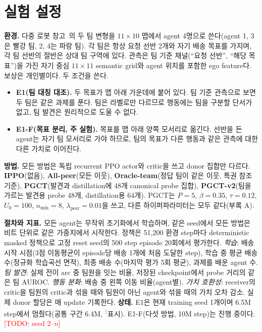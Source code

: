 \documentclass[twocolumn,10pt]{article}
\newcommand{\todo}[1]{\textcolor{red}{[TODO: #1]}}
\newcommand{\pilot}{\textsuperscript{\textcolor{gray}{$\dagger$}}}
\newcommand{\ours}{PGCT}
\begin{document}
\section{실험 설정}
\label{sec:setup}
\textbf{환경.} 다중 로봇 창고~\cite{papoudakis2021benchmarking}의 두 팀 변형을 $11\times10$ 맵에서 agent 4명으로 쓴다(agent 1, 3은 빨강 팀, 2, 4는 파랑 팀). 각 팀은
항상 요청 선반 2개와 자기 배송 목표를 가지며, 각 팀 선반의 절반은 상대 팀 구역에 있다. 관측은 팀 기준 채널(``요청 선반'', ``해당 목표'')을 가진 자기 중심
$11\times11$ semantic grid와 agent 위치를 포함한 ego feature다. 보상은 개인별이다. 두 조건을 쓴다.
\begin{itemize}
  \item \textbf{E1(팀 대칭 대조).} 두 목표가 맵 아래 가운데에 붙어 있다. 팀 기준 관측으로 보면 두 팀은 같은 과제를 푼다. 팀은 라벨로만 다르므로 행동에는 팀을 구분할
    단서가 없고, 팀 발견은 원리적으로 도울 수 없다.
  \item \textbf{E1-F(목표 분리, 주 실험).} 목표를 맵 아래 양쪽 모서리로 옮긴다. 선반을 든 agent는 자기 팀 모서리로 가야 하므로, 팀의 목표가 다른 행동과 같은 관측에
    대한 다른 가치로 이어진다.
\end{itemize}

\textbf{방법.} 모든 방법은 독립 recurrent PPO actor와 critic을 쓰고 donor 집합만 다르다. \textbf{IPPO}(없음), \textbf{All-peer}(모든 이웃), \textbf{Oracle-team}(정답
팀이 같은 이웃, 특권 참조 기준), \textbf{\ours{}}(발견과 distillation에 48개 canonical probe 집합), \textbf{\ours{}-v2}(팀을 가르는 발견용 probe 48개, distillation용 64개).
\ours{}는 $P=5$, $\beta=0.35$, $\tau=0.12$, $U_0=100$, $n_{\min}=8$, $\lambda_{\mathrm{peer}}=0.01$을 쓰고, 다른 하이퍼파라미터는 모두 같다(부록 A).

\textbf{절차와 지표.} 모든 agent는 무작위 초기화에서 학습하며, 같은 seed에서 모든 방법은 비트 단위로 같은 가중치에서 시작한다. 정책은 51{,}200 환경 step마다
deterministic masked 정책으로 고정 reset seed의 500 step episode 20회에서 평가한다. \emph{학습}: 배송 시작 시점(3점 이동평균이 episode당 배송 1개에 처음 도달한 step),
학습 중 평균 배송 수(정규화 학습곡선 면적), 최종 배송 수(마지막 평가 5회 평균), 과제를 배운 agent 수. \emph{팀 발견}: 실제 전이 arc 중 팀원을 잇는 비율, 저장된
checkpoint에서 probe 거리의 같은 팀 AUROC. \emph{행동 분화}: 배송 중 왼쪽 이동 비율(agent별). \emph{가치 호환성}: receiver의 critic을 팀원의 critic과 섞을 때와 팀원이
아닌 agent와 섞을 때의 가치 오차 감소. 실제 donor 할당은 매 update 기록한다. \textbf{상태.} E1은 현재 training seed 1개이며 6.5M step에서 멈췄다(공통 구간 6.4M,
\pilot 표시). E1-F(다섯 방법, 10M step)는 진행 중이다. \todo{seed 2--$n$}
\end{document}
